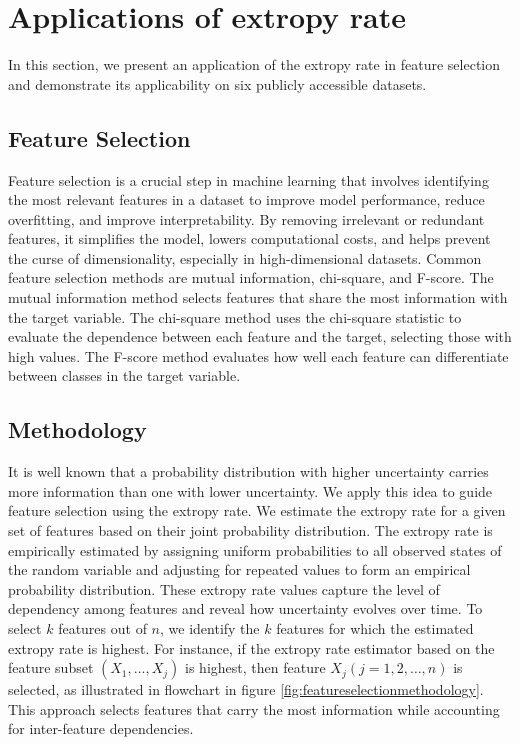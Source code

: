 \documentclass[pdflatex]{sn-jnl}%
\theoremstyle{thmstyleone}
\theoremstyle{thmstyletwo}%
\theoremstyle{thmstylethree}%
\begin{document}
\section{Applications of extropy rate}\label{applications}
In this section, we present an application of the extropy rate in feature selection and demonstrate its applicability on six publicly accessible datasets.

\subsection{Feature Selection}
Feature selection is a crucial step in machine learning that involves identifying the most relevant features in a dataset to improve model performance, reduce overfitting, and improve interpretability. By removing irrelevant or redundant features, it simplifies the model, lowers computational costs, and helps prevent the curse of dimensionality, especially in high-dimensional datasets. Common feature selection methods are mutual information, chi-square, and F-score\cite{yang1997comparative}. The mutual information method selects features that share the most information with the target variable. The chi-square method uses the chi-square statistic to evaluate the dependence between each feature and the target, selecting those with high values. The F-score method evaluates how well each feature can differentiate between classes in the target variable.
\subsection{Methodology}

It is well known that a probability distribution with higher uncertainty carries more information than one with lower uncertainty. We apply this idea to guide feature selection using the extropy rate. We estimate the extropy rate for a given set of features based on their joint probability distribution. The extropy rate is empirically estimated by assigning uniform probabilities to all observed states of the random variable and adjusting for repeated values to form an empirical probability distribution. These extropy rate values capture the level of dependency among features and reveal how uncertainty evolves over time. To select $k$ features out of $n$, we identify the $k$ features for which the estimated extropy rate is highest. For instance, if the extropy rate estimator based on the feature subset $(X_1, \ldots, X_j)$ is highest, then feature $X_j (j = 1, 2, \ldots, n)$ is selected, as illustrated in flowchart in figure \ref{fig:featureselectionmethodology}. This approach selects features that carry the most information while accounting for inter-feature dependencies.
\end{document}
